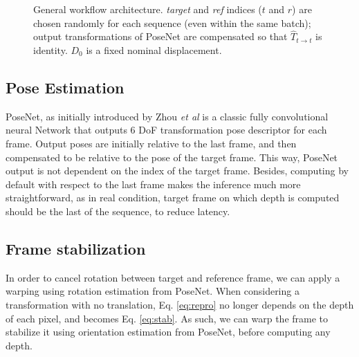 \documentclass[runningheads]{llncs}
\def\etal{\emph{et al}\:}
\begin{document}
\begin{figure}
\linebreak
\caption{General workflow architecture. \textit{target} and \textit{ref} indices ($t$ and $r$) are chosen randomly for each sequence (even within the same batch); output transformations of PoseNet are compensated so that $\widehat{T}_{t \rightarrow t}$ is identity. $D_0$ is a fixed nominal displacement.}
\label{fig:process}
\end{figure}

\subsection{Pose Estimation}
PoseNet, as initially introduced by Zhou \etal \cite{zhou2017unsupervised} is a classic fully convolutional neural Network that outputs 6 DoF transformation pose descriptor for each frame.
Output poses are initially relative to the last frame, and then compensated to be relative to the pose of the target frame. This way, PoseNet output is not dependent on the index of the target frame. Besides, computing by default with respect to the last frame makes the inference much more straightforward, as in real condition, target frame on which depth is computed should be the last of the sequence, to reduce latency.

\subsection{Frame stabilization}
In order to cancel rotation between target and reference frame, we can apply a warping using rotation estimation from PoseNet. When considering a transformation with no translation, Eq. \ref{eq:repro} no longer depends on the depth of each pixel, and becomes Eq. \ref{eq:stab}. As such, we can warp the frame to stabilize it using orientation estimation from PoseNet, before computing any depth.
\end{document}
